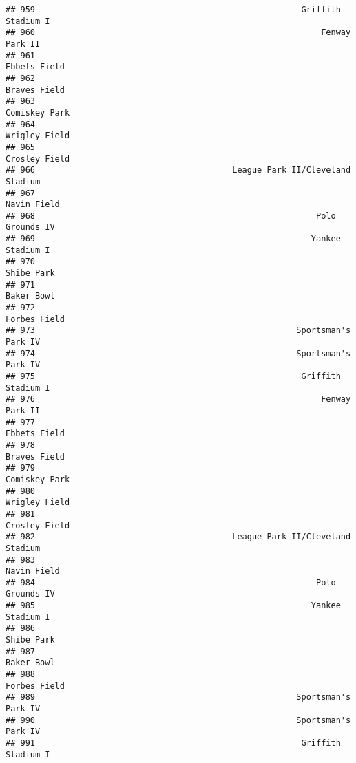 \documentclass[]{article}
\begin{document}
\begin{verbatim}
## 959                                                      Griffith Stadium I
## 960                                                          Fenway Park II
## 961                                                            Ebbets Field
## 962                                                            Braves Field
## 963                                                           Comiskey Park
## 964                                                           Wrigley Field
## 965                                                           Crosley Field
## 966                                        League Park II/Cleveland Stadium
## 967                                                             Navin Field
## 968                                                         Polo Grounds IV
## 969                                                        Yankee Stadium I
## 970                                                              Shibe Park
## 971                                                              Baker Bowl
## 972                                                            Forbes Field
## 973                                                     Sportsman's Park IV
## 974                                                     Sportsman's Park IV
## 975                                                      Griffith Stadium I
## 976                                                          Fenway Park II
## 977                                                            Ebbets Field
## 978                                                            Braves Field
## 979                                                           Comiskey Park
## 980                                                           Wrigley Field
## 981                                                           Crosley Field
## 982                                        League Park II/Cleveland Stadium
## 983                                                             Navin Field
## 984                                                         Polo Grounds IV
## 985                                                        Yankee Stadium I
## 986                                                              Shibe Park
## 987                                                              Baker Bowl
## 988                                                            Forbes Field
## 989                                                     Sportsman's Park IV
## 990                                                     Sportsman's Park IV
## 991                                                      Griffith Stadium I

\end{verbatim}
\end{document}

